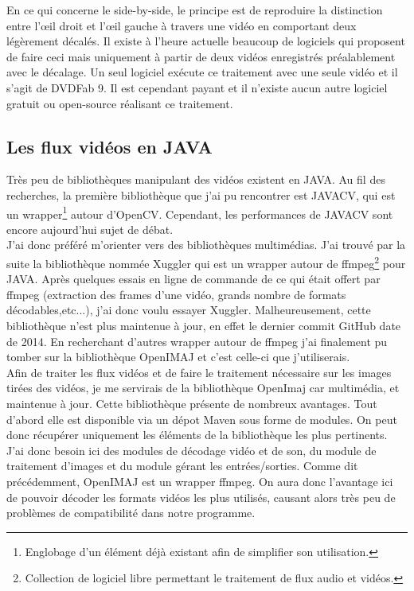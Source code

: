 \documentclass[10pt,a4paper]{article}
\begin{document}
En ce qui concerne le side-by-side, le principe est de reproduire la distinction entre l'œil droit et l'œil gauche à travers une vidéo en comportant deux légèrement décalés.
Il existe à l'heure actuelle beaucoup de logiciels qui proposent de faire ceci mais uniquement à partir de deux vidéos enregistrés préalablement avec le décalage.
Un seul logiciel exécute ce traitement avec une seule vidéo et il s'agit de DVDFab 9. Il est cependant payant et il n'existe aucun autre logiciel gratuit ou open-source réalisant ce traitement.

\subsection{Les flux vidéos en JAVA}

Très peu de bibliothèques manipulant des vidéos existent en JAVA. Au fil des recherches, la première bibliothèque que j'ai pu rencontrer est JAVACV\cite{javacv}, qui est un wrapper\footnote{Englobage d'un élément déjà existant
afin de simplifier son utilisation.} autour d'OpenCV. Cependant, les performances de JAVACV sont encore aujourd'hui sujet de débat.\\

J'ai donc préféré m'orienter vers des bibliothèques multimédias. J'ai trouvé par la suite la bibliothèque nommée Xuggler\cite{xuggler} qui est un wrapper autour de
ffmpeg\footnote{Collection de logiciel libre permettant le traitement de flux audio et vidéos.} pour JAVA. Après quelques essais en ligne de commande de ce qui était offert
par ffmpeg (extraction des frames d'une vidéo, grands nombre de formats décodables,etc...), j'ai donc voulu essayer Xuggler. Malheureusement, cette bibliothèque n'est plus maintenue à jour, en effet le dernier
commit GitHub date de 2014\cite{xugglergit}. En recherchant d'autres wrapper autour de ffmpeg j'ai finalement pu tomber sur la bibliothèque OpenIMAJ\cite{openimaj} et c'est celle-ci que j'utiliserais.\\

Afin de traiter les flux vidéos et de faire le traitement nécessaire sur les images tirées des vidéos, je me servirais de  la bibliothèque OpenImaj car multimédia, et maintenue à jour.
Cette bibliothèque présente de nombreux avantages. Tout d'abord elle est
disponible via un dépot Maven sous forme de modules\cite{openimajmvn}. On peut donc récupérer uniquement les éléments de la bibliothèque
les plus pertinents. J'ai donc besoin ici des modules de décodage vidéo et de son, du module de traitement d'images
et du module gérant les entrées/sorties.
Comme dit précédemment, OpenIMAJ est un wrapper ffmpeg. On aura donc l'avantage ici de pouvoir décoder les formats vidéos
les plus utilisés, causant alors très peu de problèmes de compatibilité dans notre
programme.\\
\end{document}
